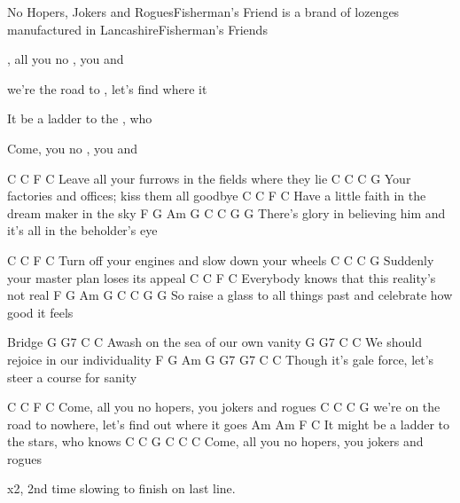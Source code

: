 \begin{SBSong}{No Hopers, Jokers and Rogues}{Fisherman's Friend is a brand of lozenges manufactured in Lancashire}{Fisherman's Friends}
  \begin{SBChorus}
    , all you no , you  and 

    we're  the road to , let's find  where it 

    It  be a ladder to the , who 

    Come,  you no , you  and  
  \end{SBChorus}

  \begin{SBVerse}
    C C F C
    Leave all your furrows in the fields where they lie
    C C C G
    Your factories and offices; kiss them all goodbye
    C C F C
    Have a little faith in the dream maker in the sky
    F G Am G C C G G
    There's glory in believing him and it's all in the beholder's eye
  \end{SBVerse}

  \begin{SBVerse}
    C C F C
    Turn off your engines and slow down your wheels
    C C C G
    Suddenly your master plan loses its appeal
    C C F C
    Everybody knows that this reality's not real
    F G Am G C C G G
    So raise a glass to all things past and celebrate how good it feels
  \end{SBVerse}

  \begin{SBBracket}{Bridge}
    G G7 C C
    Awash on the sea of our own vanity
    G G7 C C
    We should rejoice in our individuality
    F G Am G G7 G7 C C
    Though it's gale force, let's steer a course for sanity
  \end{SBBracket}

  \begin{SBChorus}
    C C F C
    Come, all you no hopers, you jokers and rogues
    C C C G
    we're on the road to nowhere, let's find out where it goes
    Am Am F C
    It might be a ladder to the stars, who knows
    C C G C C C
    Come, all you no hopers, you jokers and rogues

    x2, 2nd time slowing to finish on last line.
  \end{SBChorus}
\end{SBSong}